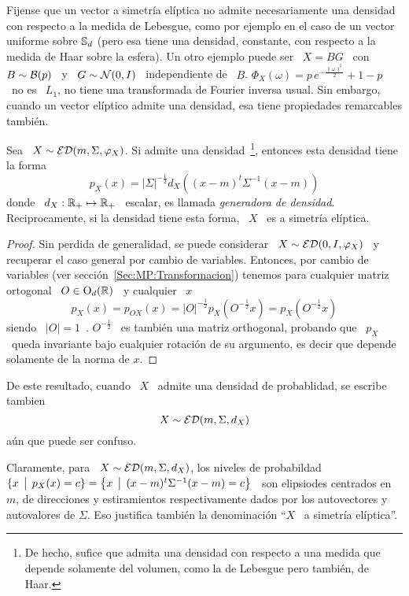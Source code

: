 Fijense  que un  vector a  simetr\'ia  el\'iptica no  admite necesariamente  una
densidad con respecto a la medida de Lebesgue, como por ejemplo en el caso de un
vector uniforme  sobre $\mathbb{S}_d$  (pero esa tiene  una densidad,  constante, con
respecto a la medida de Haar sobre la  esfera). Un otro ejemplo puede ser \ $X =
B  G$ \  con \  $B \sim  \mathcal{B}(p)$ \  y \  $G \sim  \mathcal{N}(0,I)$ \  independiente  de \
$B$. $\Phi_X(\omega)  = p \, e^{-\frac{\|  \omega \|^2}{2}} + 1  - p$ \  no es \
$L_1$, \ie  no tiene  una transformada de  Fourier inversa usual.   Sin embargo,
cuando  un  vector  el\'iptico   admite  una  densidad,  esa  tiene  propiedades
remarcables tambi\'en.
%
\begin{teorema}
%
  Sea \  $X \sim  \mathcal{ED}(m,\Sigma,\varphi_X)$. Si admite  una densidad~\footnote{De
    hecho, sufice que admita una densidad  con respecto a una medida que depende
    solamente  del volumen,  como  la  de Lebesgue  pero  tambi\'en, de  Haar.},
  entonces esta densidad tiene la forma
  \[
  p_X(x)  = |\Sigma|^{-\frac12} d_X\left( (x-m)^t \Sigma^{-1} (x-m) \right)
  \]
  donde \ $d_X:  \mathbb{R}_+ \mapsto \mathbb{R}_+$ \ escalar,  es llamada {\em generadora
    de densidad}. Reciprocamente, si la densidad  tiene esta forma, \ $X$ \ es a
  simetr\'ia el\'iptica.
\end{teorema}
%
\begin{proof}
  Sin perdida de generalidad, se  puede considerar \ $X \sim \mathcal{ED}(0,I,\varphi_X)$
  \ y recuperar  el caso general por cambio de  variables.  Entonces, por cambio
  de   variables   (ver   secci\'on~\ref{Sec:MP:Transformacion})  tenemos   para
  cualquier matriz ortogonal \ $O \in \mathrm{O}_d(\mathbb{R})$ \ y cualquier \ $x$
  \[
  p_X(x)  = p_{O  X}(x)  =  |O|^{-\frac12} p_X\left(  O^{-\frac12}  x \right)  =
  p_X\left( O^{-\frac12} x \right)
  \]
  siendo \ $|O|  = 1$~\cite{Bha97, HorJoh13}. $O^{-\frac12}$ \  es tambi\'en una
  matriz  orthogonal, probando  que \  $p_X$ \  queda invariante  bajo cualquier
  rotaci\'on de su argumento, es decir que depende solamente de la norma de $x$.
\end{proof}

De este resultado, cuando \ $X$ \ admite una densidad de probablidad, se escribe
tambien
%
\[
X \sim \mathcal{ED}(m,\Sigma,d_X)
\]
%
a\'un que puede ser confuso.

Claramente, para \ $X \sim  \mathcal{ED}(m,\Sigma,d_X)$, los niveles de probabildad \ $\{
x \:\: \big| \:\: p_X(x)  = c \} = \left\{  x \:\: \big| \:\: (x-m)^t \Sigma^{-1} (x-m) =  c \right\}$ \
son   elipsiodes  centrados   en   \  $m$,   de   direcciones  y   estiramientos
respectivamente  dados por  los  autovectores y  autovalores  de $\Sigma$.   Eso
justifica tambi\'en la denominaci\'on ``$X$ \ a simetr\'ia el\'iptica''.

